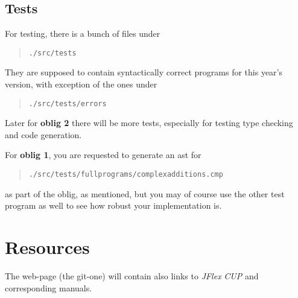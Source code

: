 \documentclass[10pt,freeform]{handout}[2014/08/13]
\begin{document}
\subsection{Tests}
\label{sec:tests}

For testing, there is a bunch of files under

\begin{quote}
  \texttt{./src/tests}
\end{quote}

They are supposed to contain syntactically correct programs for this year's
version, with exception of the ones under
\begin{quote}
  \texttt{./src/tests/errors}
\end{quote}
Later for \textbf{oblig 2} there will be more tests, especially for testing
type checking and code generation. 


For \textbf{oblig 1}, you are requested to generate an ast for
\begin{quote}
  \texttt{./src/tests/fullprograms/complexadditions.cmp}  
\end{quote}
as part of the oblig, as mentioned, but you may of course use the other
test program as well to see how robust your implementation is. 








\section{Resources}
\label{sec:resources}

The web-page (the git-one) will contain also links to \textsl{JFlex}
\textsl{CUP} and corresponding manuals.
\end{document}
